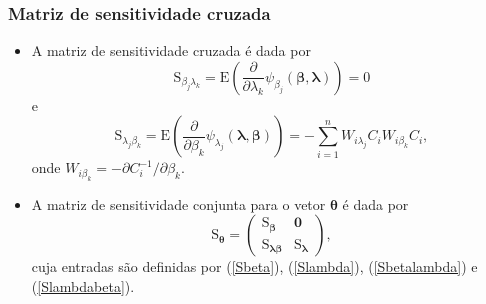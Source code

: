 \documentclass[10pt, aspectratio=169]{beamer}\usepackage[]{graphicx}\usepackage[]{color}
\begin{document}
\begin{frame}[c]
\frametitle{Matriz de sensitividade cruzada}
\begin{itemize}
\item A matriz de sensitividade cruzada é dada por
\begin{equation}
\label{Sbetalambda}
\mathrm{S}_{\beta_j \lambda_k} = \mathrm{E}\left ( \frac{\partial}{\partial \lambda_k}\psi_{\beta_j}(\boldsymbol{\beta}, \boldsymbol{\lambda})  \right ) = 0
\end{equation}
e
\begin{equation}
\label{Slambdabeta}
\mathrm{S}_{\lambda_j \beta_k} = \mathrm{E}\left ( \frac{\partial}{\partial \beta_k}\psi_{\lambda_j}(\boldsymbol{\lambda}, \boldsymbol{\beta})  \right ) = -\sum_{i=1}^n W_{i\lambda_j}C_i W_{i\beta_k}C_i,
\end{equation}
onde $W_{i\beta_k} = -\partial C_i^{-1}/\partial \beta_k$. 
\item A matriz de sensitividade conjunta para o vetor $\boldsymbol{\theta}$ é dada por
\begin{equation*}
\mathrm{S}_{\boldsymbol{\theta}} = \begin{pmatrix}
\mathrm{S}_{\boldsymbol{\beta}} & \boldsymbol{0} \\ 
\mathrm{S}_{\boldsymbol{\lambda}\boldsymbol{\beta}} & \mathrm{S}_{\boldsymbol{\lambda}}
\end{pmatrix},
\end{equation*}
cuja entradas são definidas por (\ref{Sbeta}), (\ref{Slambda}), (\ref{Sbetalambda}) e (\ref{Slambdabeta}).
\end{itemize}
\end{frame}
\end{document}
